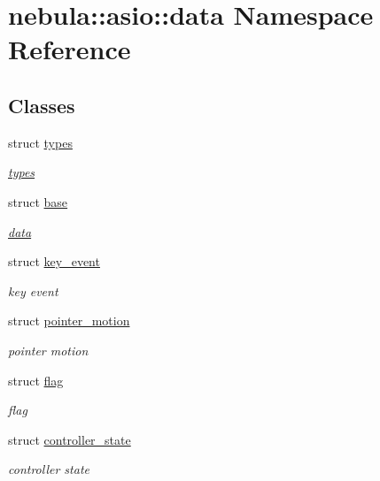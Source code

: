 \hypertarget{namespacenebula_1_1asio_1_1data}{
\section{nebula::asio::data Namespace Reference}
\label{namespacenebula_1_1asio_1_1data}
}
\subsection*{Classes}
\begin{DoxyCompactItemize}
\item 
struct \hyperlink{structnebula_1_1asio_1_1data_1_1types}{types}
\begin{DoxyCompactList}\small\item\em \hyperlink{structnebula_1_1asio_1_1data_1_1types}{types} \item\end{DoxyCompactList}\item 
struct \hyperlink{structnebula_1_1asio_1_1data_1_1base}{base}
\begin{DoxyCompactList}\small\item\em \hyperlink{namespacenebula_1_1asio_1_1data}{data} \item\end{DoxyCompactList}\item 
struct \hyperlink{structnebula_1_1asio_1_1data_1_1key__event}{key\_\-event}
\begin{DoxyCompactList}\small\item\em key event \item\end{DoxyCompactList}\item 
struct \hyperlink{structnebula_1_1asio_1_1data_1_1pointer__motion}{pointer\_\-motion}
\begin{DoxyCompactList}\small\item\em pointer motion \item\end{DoxyCompactList}\item 
struct \hyperlink{structnebula_1_1asio_1_1data_1_1flag}{flag}
\begin{DoxyCompactList}\small\item\em flag \item\end{DoxyCompactList}\item 
struct \hyperlink{structnebula_1_1asio_1_1data_1_1controller__state}{controller\_\-state}
\begin{DoxyCompactList}\small\item\em controller state \item\end{DoxyCompactList}\end{DoxyCompactItemize}
